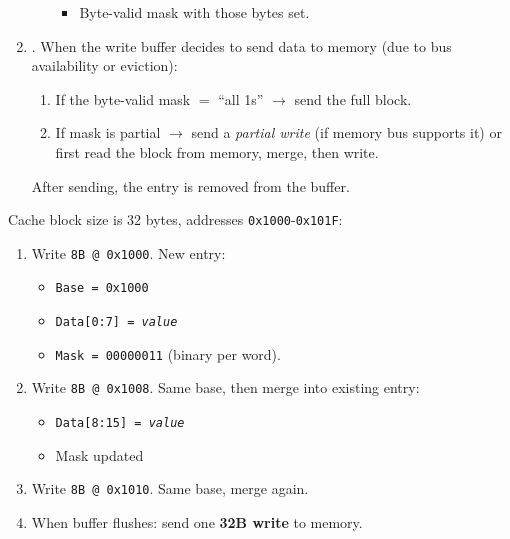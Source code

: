 \begin{enumerate}
\begin{itemize}
\begin{itemize}
            \item Byte-valid mask with those bytes set.
        \end{itemize}
    \end{itemize}
    \item {}. When the write buffer decides to send data to memory (due to bus availability or eviction):
    \begin{enumerate}
        \item If the byte-valid mask $=$ ``all 1s'' $\rightarrow$ send the full block.
        \item If mask is partial $\rightarrow$ send a \emph{partial write} (if memory bus supports it) or first read the block from memory, merge, then write.
    \end{enumerate}
    After sending, the entry is removed from the buffer.
\end{enumerate}

\highspace
\begin{examplebox}
    Cache block size is 32 bytes, addresses \texttt{0x1000}-\texttt{0x101F}:
    \begin{enumerate}
        \item Write \texttt{8B @ 0x1000}. New entry:
        \begin{itemize}
            \item \texttt{Base = 0x1000}
            \item \texttt{Data[0:7] = \emph{value}}
            \item \texttt{Mask = 00000011} (binary per word).
        \end{itemize}
        \item Write \texttt{8B @ 0x1008}. Same base, then merge into existing entry:
        \begin{itemize}
            \item \texttt{Data[8:15] = \emph{value}}
            \item Mask updated
        \end{itemize}
        \item Write \texttt{8B @ 0x1010}. Same base, merge again.
        \item When buffer flushes: send one \textbf{32B write} to memory.
    \end{enumerate}
\end{examplebox}

